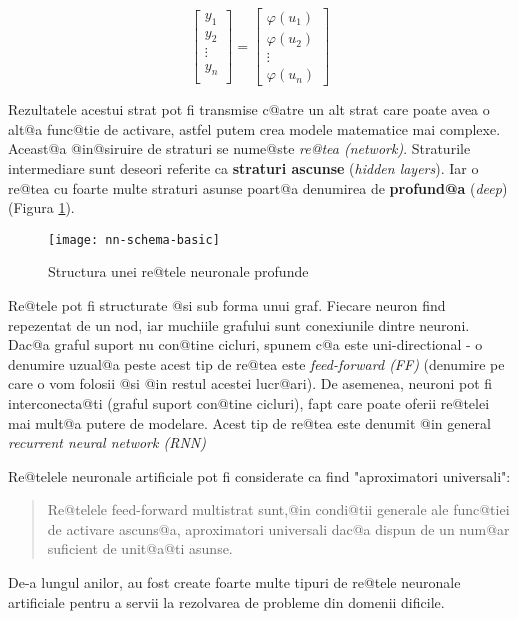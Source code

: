 $$
\begin{bmatrix}
		y_1 \\
		y_2 \\
		\vdots \\ 
		y_n \\
	\end{bmatrix}	
	=
	\begin{bmatrix}
		\varphi (u_1)\\
		\varphi	(u_2) \\
		\vdots \\
		\varphi (u_n)
	\end{bmatrix}
$$

Rezultatele acestui strat pot fi transmise c@atre un alt strat care poate avea o alt@a func@tie de activare, astfel putem crea modele matematice mai complexe. Aceast@a @in@siruire de straturi se nume@ste {\sl re@tea (network)}. Straturile intermediare sunt deseori referite ca \textbf{straturi ascunse} (\textsl{hidden layers}). Iar o re@tea cu foarte multe straturi asunse poart@a denumirea de \textbf{profund@a} (\textsl{deep}) (Figura \ref{nn:schema-basic}).

\begin{figure}[h]
	\centering
	\texttt{[image: nn-schema-basic]}
	\caption{Structura unei re@tele neuronale profunde}
	\label{nn:schema-basic}
\end{figure}


Re@tele pot fi structurate @si sub forma unui graf. Fiecare neuron find repezentat de un nod, iar muchiile grafului sunt conexiunile dintre neuroni. Dac@a graful suport nu con@tine cicluri, spunem c@a este uni-directional - o denumire uzual@a peste acest tip de re@tea este {\sl feed-forward (FF)} (denumire pe care o vom folosii @si @in restul acestei lucr@ari). De asemenea, neuroni pot fi interconecta@ti (graful suport con@tine cicluri), fapt care poate oferii re@telei mai mult@a putere de modelare. Acest tip de re@tea este denumit @in general {\sl recurrent neural network (RNN)}

Re@telele neuronale artificiale pot fi considerate ca find "aproximatori universali"\cite{hornik-nn}: 
\begin{quotation}
	Re@telele feed-forward multistrat sunt,@in condi@tii generale ale func@tiei de activare ascuns@a, aproximatori universali dac@a dispun de un num@ar suficient de unit@a@ti asunse.
\end{quotation}

De-a lungul anilor, au fost create foarte multe tipuri de re@tele neuronale artificiale pentru a servii la rezolvarea de probleme din domenii dificile.

